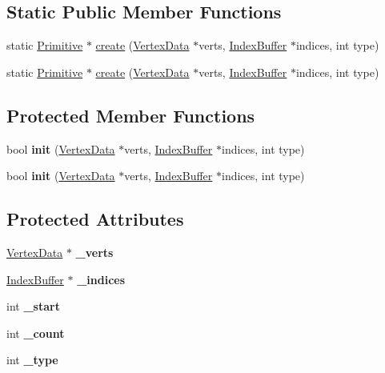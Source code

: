 \subsection*{Static Public Member Functions}
\begin{DoxyCompactItemize}
\item 
static \hyperlink{classPrimitive}{Primitive} $\ast$ \hyperlink{classPrimitive_a21a3af16690a1f7204f12143b393e874}{create} (\hyperlink{classVertexData}{Vertex\+Data} $\ast$verts, \hyperlink{classIndexBuffer}{Index\+Buffer} $\ast$indices, int type)
\item 
static \hyperlink{classPrimitive}{Primitive} $\ast$ \hyperlink{classPrimitive_ad232beeef1d2a7bc47a3618cc3c3c1ad}{create} (\hyperlink{classVertexData}{Vertex\+Data} $\ast$verts, \hyperlink{classIndexBuffer}{Index\+Buffer} $\ast$indices, int type)
\end{DoxyCompactItemize}
\subsection*{Protected Member Functions}
\begin{DoxyCompactItemize}
\item 
\mbox{\label{classPrimitive_a57404a50495fa39d85257851700b6688}} 
bool {\bfseries init} (\hyperlink{classVertexData}{Vertex\+Data} $\ast$verts, \hyperlink{classIndexBuffer}{Index\+Buffer} $\ast$indices, int type)
\item 
\mbox{\label{classPrimitive_a57404a50495fa39d85257851700b6688}} 
bool {\bfseries init} (\hyperlink{classVertexData}{Vertex\+Data} $\ast$verts, \hyperlink{classIndexBuffer}{Index\+Buffer} $\ast$indices, int type)
\end{DoxyCompactItemize}
\subsection*{Protected Attributes}
\begin{DoxyCompactItemize}
\item 
\mbox{\label{classPrimitive_a651524b2c93c8ee9f3736aa2c2576af5}} 
\hyperlink{classVertexData}{Vertex\+Data} $\ast$ {\bfseries \+\_\+verts}
\item 
\mbox{\label{classPrimitive_a70b538d75b5747f261d76389eeecbac6}} 
\hyperlink{classIndexBuffer}{Index\+Buffer} $\ast$ {\bfseries \+\_\+indices}
\item 
\mbox{\label{classPrimitive_a2dcaace4025de89ed297379c3ed727f8}} 
int {\bfseries \+\_\+start}
\item 
\mbox{\label{classPrimitive_afc08774577a82bcb5222683bb9fdbb20}} 
int {\bfseries \+\_\+count}
\item 
\mbox{\label{classPrimitive_aed4ff82141748c9df23ce612ba26baf4}} 
int {\bfseries \+\_\+type}
\end{DoxyCompactItemize}


